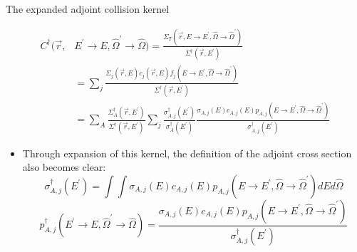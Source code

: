 \documentclass{beamer}
\begin{document}
\begin{frame}{The expanded adjoint collision kernel}
  
  \begin{align}
    C^{\dagger}(\vec{r},&E^{'} \to E,\hat{\Omega}^{'} \to \hat{\Omega}) =
    \frac{\Sigma_T(\vec{r},E \to E^{'},\hat{\Omega} \to \hat{\Omega}^{'})}
         {\Sigma^{\dagger}(\vec{r},E^{'})} \nonumber \\
         & = \sum_j 
         \frac{\Sigma_{j}(\vec{r},E)c_j(\vec{r},E)
           f_j(E \to E^{'},\hat{\Omega} \to \hat{\Omega}^{'})}
              {\Sigma^{\dagger}(\vec{r},E^{'})} \nonumber \\
              & = \sum_A \frac{\Sigma_A^{\dagger}(\vec{r},E^{'})}
              {\Sigma^{\dagger}(\vec{r},E^{'})}
              \sum_j \frac{\sigma_{A,j}^{\dagger}(E^{'})}{\sigma_A^{\dagger}(E^{'})}
              \frac{\sigma_{A,j}(E) c_{A,j}(E) 
                p_{A,j}(E \to E^{'},\hat{\Omega} \to \hat{\Omega}^{'})}
                   {\sigma_{A,j}^{\dagger}(E^{'})} \nonumber
  \end{align}

  \begin{itemize}
    \item Through expansion of this kernel, the definition of the adjoint
      cross section also becomes clear:
      \begin{equation*}
        \sigma_{A,j}^{\dagger}(E^{'}) = \int\int
        \sigma_{A,j}(E)c_{A,j}(E) 
        p_{A,j}(E \to E^{'},\hat{\Omega} \to \hat{\Omega}^{'}) dE d\hat{\Omega}
      \end{equation*}
      \begin{equation*}
        p_{A,j}^{\dagger}(E^{'} \to E,\hat{\Omega}^{'} \to \hat{\Omega}) = 
        \frac{\sigma_{A,j}(E)c_{A,j}(E) 
          p_{A,j}(E \to E^{'},\hat{\Omega} \to \hat{\Omega}^{'})}
             {\sigma_{A,j}^{\dagger}(E^{'})}
      \end{equation*}
  \end{itemize}
  
\end{frame}
\end{document}
